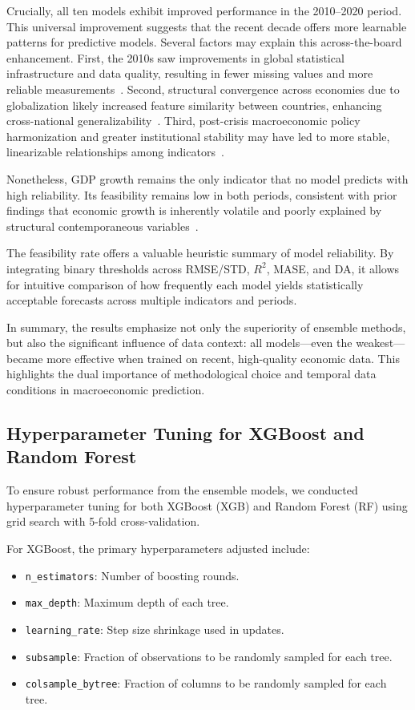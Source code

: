\documentclass[12pt]{article}
\begin{document}
Crucially, all ten models exhibit improved performance in the 2010–2020 period. This universal improvement suggests that the recent decade offers more learnable patterns for predictive models. Several factors may explain this across-the-board enhancement. First, the 2010s saw improvements in global statistical infrastructure and data quality, resulting in fewer missing values and more reliable measurements~\cite{jerven2013poor}. Second, structural convergence across economies due to globalization likely increased feature similarity between countries, enhancing cross-national generalizability~\cite{baldwin2016great}. Third, post-crisis macroeconomic policy harmonization and greater institutional stability may have led to more stable, linearizable relationships among indicators~\cite{blanchard2015inflation}.

Nonetheless, GDP growth remains the only indicator that no model predicts with high reliability. Its feasibility remains low in both periods, consistent with prior findings that economic growth is inherently volatile and poorly explained by structural contemporaneous variables~\cite{ClementsHendry2002, Loungani2001}.

The feasibility rate offers a valuable heuristic summary of model reliability. By integrating binary thresholds across RMSE/STD, $R^2$, MASE, and DA, it allows for intuitive comparison of how frequently each model yields statistically acceptable forecasts across multiple indicators and periods.

In summary, the results emphasize not only the superiority of ensemble methods, but also the significant influence of data context: all models—even the weakest—became more effective when trained on recent, high-quality economic data. This highlights the dual importance of methodological choice and temporal data conditions in macroeconomic prediction.

\subsection{Hyperparameter Tuning for XGBoost and Random Forest}

To ensure robust performance from the ensemble models, we conducted hyperparameter tuning for both XGBoost (XGB) and Random Forest (RF) using grid search with 5-fold cross-validation.

For XGBoost, the primary hyperparameters adjusted include:
\begin{itemize}
    \item \texttt{n\_estimators}: Number of boosting rounds.
    \item \texttt{max\_depth}: Maximum depth of each tree.
    \item \texttt{learning\_rate}: Step size shrinkage used in updates.
    \item \texttt{subsample}: Fraction of observations to be randomly sampled for each tree.
    \item \texttt{colsample\_bytree}: Fraction of columns to be randomly sampled for each tree.
\end{itemize}
\end{document}
